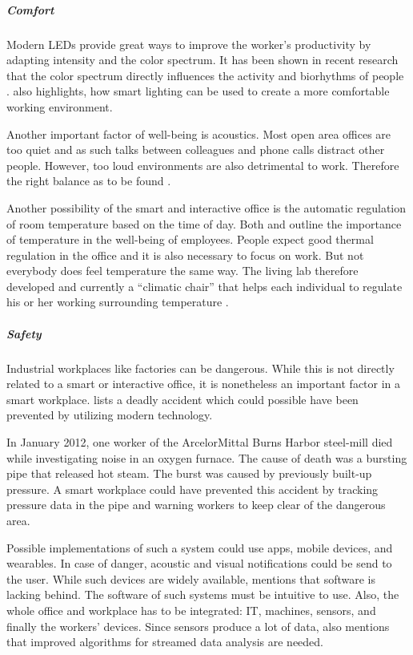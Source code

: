 \subparagraph{Comfort}\label{sec:sda-comfort}
Modern LEDs provide great ways to improve the worker's productivity by adapting intensity and the color spectrum. It has been shown in recent research that the color spectrum directly influences the activity and biorhythms of people  \cite{living-lab}. \cite{iotagenda} also highlights, how smart lighting can be used to create a more comfortable working environment.

Another important factor of well-being is acoustics. Most open area offices are too quiet and as such talks between colleagues and phone calls distract other people. However, too loud environments are also detrimental to work. Therefore the right balance as to be found \cite{living-lab}. 

Another possibility of the smart and interactive office is the automatic regulation of room temperature based on the time of day. Both \cite{iotagenda} and \cite{living-lab} outline the importance of temperature in the well-being of employees. People expect good thermal regulation in the office and it is also necessary to focus on work. But not everybody does feel temperature the same way. The living lab therefore developed and currently a ``climatic chair'' that helps each individual to regulate his or her working surrounding temperature \cite{living-lab}.


\subparagraph{Safety}\label{sec:sda-safety}
Industrial workplaces like factories can be dangerous. While this is not directly related to a smart or interactive office, it is nonetheless an important factor in a smart workplace. \cite{sda-wired} lists a deadly accident which could possible have been prevented by utilizing modern technology.

In January 2012, one worker of the ArcelorMittal Burns Harbor steel-mill died while investigating noise in an oxygen furnace. The cause of death was a bursting pipe that released hot steam. The burst was caused by previously built-up pressure. A smart workplace could have prevented this accident by tracking pressure data in the pipe and warning workers to keep clear of the dangerous area.

Possible implementations of such a system could use apps, mobile devices, and wearables. In case of danger, acoustic and visual notifications could be send to the user. While such devices are widely available, \cite{sda-wired} mentions that software is lacking behind. The software of such systems must be intuitive to use. Also, the whole office and workplace has to be integrated: IT, machines, sensors, and finally the workers' devices. Since sensors produce a lot of data, \cite{sda-wired} also mentions that improved algorithms for streamed data analysis are needed.

